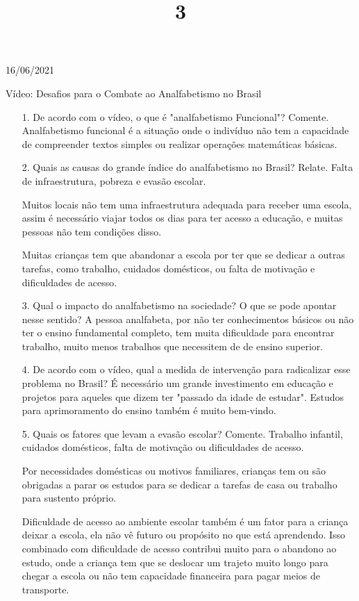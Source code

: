 \documentclass{SchoolBook}
\begin{document}
    \begin{day}{16/06/2021}
        \title{3}{Vídeo: Desafios para o Combate ao Analfabetismo no Brasil}
        
        \begin{enumerate}
            \item[1.] De acordo com o vídeo, o que é "analfabetismo Funcional"? Comente.
            \response Analfabetismo funcional é a situação onde o indivíduo não tem a capacidade de compreender textos simples ou realizar operações matemáticas básicas.
            
            \item[2.] Quais as causas do grande índice do analfabetismo no Brasil? Relate.
            \response Falta de infraestrutura, pobreza e evasão escolar.
            
            Muitos locais não tem uma infraestrutura adequada para receber uma escola, assim é necessário viajar todos os dias para ter acesso a educação, e muitas pessoas não tem condições disso.
            
            Muitas crianças tem que abandonar a escola por ter que se dedicar a outras tarefas, como trabalho, cuidados domésticos, ou falta de motivação e dificuldades de acesso.
            
            \item[3.] Qual o impacto do analfabetismo na sociedade? O que se pode apontar nesse sentido?
            \response A pessoa analfabeta, por não ter conhecimentos básicos ou não ter o ensino fundamental completo, tem muita dificuldade para encontrar trabalho, muito menos trabalhos que necessitem de de ensino superior.
            
            \item[4.] De acordo com o vídeo, qual a medida de intervenção para radicalizar esse problema no Brasil?
            \response É necessário um grande investimento em educação e projetos para aqueles que dizem ter "passado da idade de estudar". Estudos para aprimoramento do ensino também é muito bem-vindo.
            
            \item[5.] Quais os fatores que levam a evasão escolar? Comente.
            \response Trabalho infantil, cuidados domésticos, falta de motivação ou dificuldades de acesso.
            
            Por necessidades domésticas ou motivos familiares, crianças tem ou são obrigadas a parar os estudos para se dedicar a tarefas de casa ou trabalho para sustento próprio.
            
            Dificuldade de acesso ao ambiente escolar também é um fator para a criança deixar a escola, ela não vê futuro ou propósito no que está aprendendo. Isso combinado com dificuldade de acesso contribui muito para o abandono ao estudo, onde a criança tem que se deslocar um trajeto muito longo para chegar a escola ou não tem capacidade financeira para pagar meios de transporte.
        \end{enumerate} 
    \end{day}
    
\end{document}
